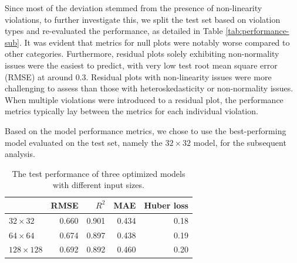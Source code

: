\documentclass[]{interact}
\theoremstyle{plain}%
\theoremstyle{definition}
\theoremstyle{remark}
\begin{document}
Since most of the deviation stemmed from the presence of non-linearity
violations, to further investigate this, we split the test set based on
violation types and re-evaluated the performance, as detailed in Table
\ref{tab:performance-sub}. It was evident that metrics for null plots
were notably worse compared to other categories. Furthermore, residual
plots solely exhibiting non-normality issues were the easiest to
predict, with very low test root mean square error (RMSE) at around
\(0.3\). Residual plots with non-linearity issues were more challenging
to assess than those with heteroskedasticity or non-normality issues.
When multiple violations were introduced to a residual plot, the
performance metrics typically lay between the metrics for each
individual violation.

Based on the model performance metrics, we chose to use the
best-performing model evaluated on the test set, namely the
\(32 \times 32\) model, for the subsequent analysis.

\begin{table}

\caption{\label{tab:performance}The test performance of three optimized models with different input sizes.}
\centering
\begin{tabular}[t]{lrrrr}
\toprule
 & RMSE & $R^2$ & MAE & Huber loss\\
\midrule
$32 \times 32$ & 0.660 & 0.901 & 0.434 & 0.18\\
$64 \times 64$ & 0.674 & 0.897 & 0.438 & 0.19\\
$128 \times 128$ & 0.692 & 0.892 & 0.460 & 0.20\\
\bottomrule
\end{tabular}
\end{table}
\end{document}
